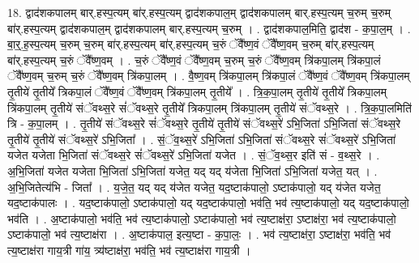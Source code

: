 \documentclass[17pt]{extarticle}
\begin{document}
18. द्वाद॑शकपालम् बार्.हस्प॒त्यम् बा॑र्.हस्प॒त्यम् द्वाद॑शकपाल॒म् द्वाद॑शकपालम् बार्.हस्प॒त्यम् च॒रुम् च॒रुम् बा॑र्.हस्प॒त्यम् द्वाद॑शकपाल॒म् द्वाद॑शकपालम् बार्.हस्प॒त्यम् च॒रुम् । . द्वाद॑शकपाल॒मिति॒ द्वाद॑श - क॒पा॒ल॒म् । . बा॒र्॒.ह॒स्प॒त्यम् च॒रुम् च॒रुम् बा॑र्.हस्प॒त्यम् बा॑र्.हस्प॒त्यम् च॒रुं ॅवै᳚ष्ण॒वं ॅवै᳚ष्ण॒वम् च॒रुम् बा॑र्.हस्प॒त्यम् बा॑र्.हस्प॒त्यम् च॒रुं ॅवै᳚ष्ण॒वम् । . च॒रुं ॅवै᳚ष्ण॒वं ॅवै᳚ष्ण॒वम् च॒रुम् च॒रुं ॅवै᳚ष्ण॒वम् त्रि॑कपा॒लम् त्रि॑कपा॒लं ॅवै᳚ष्ण॒वम् च॒रुम् च॒रुं ॅवै᳚ष्ण॒वम् त्रि॑कपा॒लम् । . वै॒ष्ण॒वम् त्रि॑कपा॒लम् त्रि॑कपा॒लं ॅवै᳚ष्ण॒वं ॅवै᳚ष्ण॒वम् त्रि॑कपा॒लम् तृ॒तीये॑ तृ॒तीये᳚ त्रिकपा॒लं ॅवै᳚ष्ण॒वं ॅवै᳚ष्ण॒वम् त्रि॑कपा॒लम् तृ॒तीये᳚ । . त्रि॒क॒पा॒लम् तृ॒तीये॑ तृ॒तीये᳚ त्रिकपा॒लम् त्रि॑कपा॒लम् तृ॒तीये॑ संॅवथ्स॒रे सं॑ॅवथ्स॒रे तृ॒तीये᳚ त्रिकपा॒लम् त्रि॑कपा॒लम् तृ॒तीये॑ संॅवथ्स॒रे । . त्रि॒क॒पा॒लमिति॑ त्रि - क॒पा॒लम् । . तृ॒तीये॑ संॅवथ्स॒रे सं॑ॅवथ्स॒रे तृ॒तीये॑ तृ॒तीये॑ संॅवथ्स॒रे॑ ऽभि॒जिता॑ ऽभि॒जिता॑ संॅवथ्स॒रे तृ॒तीये॑ तृ॒तीये॑ संॅवथ्स॒रे॑ ऽभि॒जिता᳚ । . सं॒ॅव॒थ्स॒रे॑ ऽभि॒जिता॑ ऽभि॒जिता॑ संॅवथ्स॒रे सं॑ॅवथ्स॒रे॑ ऽभि॒जिता॑ यजेत यजेता भि॒जिता॑ संॅवथ्स॒रे सं॑ॅवथ्स॒रे॑ ऽभि॒जिता॑ यजेत । . सं॒ॅव॒थ्स॒र इति॑ सं - व॒थ्स॒रे । . अ॒भि॒जिता॑ यजेत यजेता भि॒जिता॑ ऽभि॒जिता॑ यजेत॒ यद् यद् य॑जेता भि॒जिता॑ ऽभि॒जिता॑ यजेत॒ यत् । . अ॒भि॒जितेत्य॑भि - जिता᳚ । . य॒जे॒त॒ यद् यद् य॑जेत यजेत॒ यद॒ष्टाक॑पालो॒ ऽष्टाक॑पालो॒ यद् य॑जेत यजेत॒ यद॒ष्टाक॑पालः । . यद॒ष्टाक॑पालो॒ ऽष्टाक॑पालो॒ यद् यद॒ष्टाक॑पालो॒ भव॑ति॒ भव॑ त्य॒ष्टाक॑पालो॒ यद् यद॒ष्टाक॑पालो॒ भव॑ति । . अ॒ष्टाक॑पालो॒ भव॑ति॒ भव॑ त्य॒ष्टाक॑पालो॒ ऽष्टाक॑पालो॒ भव॑ त्य॒ष्टाक्ष॑रा॒ ऽष्टाक्ष॑रा॒ भव॑ त्य॒ष्टाक॑पालो॒ ऽष्टाक॑पालो॒ भव॑ त्य॒ष्टाक्ष॑रा । . अ॒ष्टाक॑पाल॒ इत्य॒ष्टा - क॒पा॒लः॒ । . भव॑ त्य॒ष्टाक्ष॑रा॒ ऽष्टाक्ष॑रा॒ भव॑ति॒ भव॑ त्य॒ष्टाक्ष॑रा गाय॒त्री गा॑य॒ त्र्य॑ष्टाक्ष॑रा॒ भव॑ति॒ भव॑ त्य॒ष्टाक्ष॑रा गाय॒त्री । \newline
\end{document}
